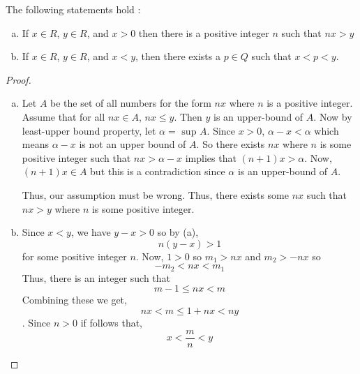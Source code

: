 \begin{thm}
    The following statements hold : 
    \begin{enumerate}[a)]
        \item If $x \in R$, $y \in R$, and $x > 0$ then there is a positive integer $n$ such that 
        $ nx > y $
        \item If $x \in R$, $y \in R$, and $x < y$, then there exists a $p \in Q$ such that $x < p < y$.
    \end{enumerate}
    \begin{proof}
        \begin{enumerate}[a)]
            \item 
            Let $A$ be the set of all numbers for the form $nx$ where $n$ is a positive integer. 
            Assume that for all $nx \in A$, $nx \leq y$. Then $y$ is an upper-bound of $A$.
            Now by least-upper bound property, let $\alpha = \text{ sup } A$.
            Since $x > 0$, $\alpha - x < \alpha$ which means $\alpha - x$ is not an upper bound of $A$.
            So there exists $nx$ where $n$ is some positive integer such that $nx > \alpha - x$ implies that $(n+1)x > \alpha$.
            Now, $(n+1)x \in A$ but this is a contradiction since $\alpha$ is an upper-bound of $A$.

            Thus, our assumption must be wrong. Thus, there exists some $nx$ such that $nx > y$ where $n$ is some positive integer.
            
            \item
            Since $x < y$, we have $y - x > 0$ so by (a), $$ n(y - x) > 1 $$ for some positive integer $n$.
            Now, $1 > 0$ so $m_1 > nx$ and $m_2 > -nx$ so $$ -m_2 < nx < m_1 $$
            Thus, there is an integer such that $$ m - 1 \leq nx < m $$
            Combining these we get, $$ nx < m \leq 1 + nx < ny $$.
            Since $n > 0$ if follows that, $$ x < \frac{m}{n} < y $$
        \end{enumerate}
    \end{proof}
\end{thm}


